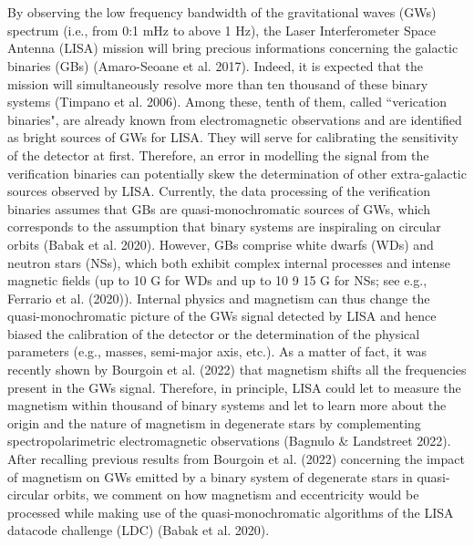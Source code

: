 \documentclass[a4paper,10.5pt]{article}
\begin{document}
\section{}
By observing the low frequency bandwidth of the gravitational waves (GWs) spectrum (i.e., from 0:1 mHz to above 1 Hz), the Laser Interferometer Space Antenna (LISA) mission will bring precious informations concerning the galactic binaries (GBs) (Amaro-Seoane et al. 2017). Indeed, it is expected that the mission will simultaneously resolve more than ten thousand of these binary systems (Timpano et al. 2006). Among these, tenth of them, called ``verication binaries", are already known from electromagnetic observations and are identified as bright sources of GWs for LISA. They will serve for calibrating the sensitivity of the detector at first. Therefore, an error in modelling the signal from the verification binaries can potentially skew the determination of other extra-galactic sources observed by LISA. Currently, the data processing of the verification binaries assumes that GBs are quasi-monochromatic sources of GWs, which corresponds to the assumption that binary systems are inspiraling on circular orbits (Babak et al. 2020). However, GBs comprise white dwarfs (WDs) and neutron stars (NSs), which both exhibit complex internal processes and intense magnetic fields (up to 10 G for WDs and up to 10 9 15 G for NSs; see e.g., Ferrario et al. (2020)). Internal physics and magnetism can thus change the quasi-monochromatic picture of the GWs signal detected by LISA and hence biased the calibration of the detector or the determination of the physical parameters (e.g., masses, semi-major axis, etc.). As a matter of fact, it was recently shown by Bourgoin et al. (2022) that magnetism shifts all the frequencies present in the GWs signal. Therefore, in principle, LISA could let to measure the magnetism within thousand of binary systems and let to learn more about the origin and the nature of magnetism in degenerate stars by complementing spectropolarimetric electromagnetic observations (Bagnulo & Landstreet 2022).
\\
After recalling previous results from Bourgoin et al. (2022) concerning the impact of magnetism on GWs emitted by a binary system of degenerate stars in quasi-circular orbits, we comment on how magnetism and eccentricity would be processed while making use of the quasi-monochromatic algorithms of the LISA datacode challenge (LDC) (Babak et al. 2020).\\
\end{document}
